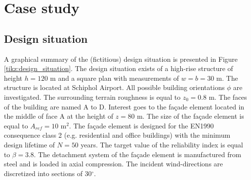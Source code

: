%
%
%
%
%
%
%
%


\section{Case study}\label{case_study}

\subsection{Design situation}
A graphical summary of the (fictitious) design situation is presented in Figure \ref{tikz:design_situation}. The design situation exists of a  high-rise structure of height  $h=120$ m and a square plan with measurements of $w=b=30$ m. The structure is located at Schiphol Airport. All possible building orientations $\phi$ are investigated. The surrounding terrain roughness is equal to $z_0=0.8$ m. The faces of the building are named A to D. Interest goes to the fa\c{c}ade element located in the middle of face A at the height of $z=80$ m. The size of the fa\c{c}ade element is equal to  $A_{ref}=10$ m$^2$. The fa\c{c}ade element is designed for the EN1990 consequence class 2 (e.g. residential and office buildings) with the minimum design lifetime of $N=50$ years. The target value of the reliability index is equal to $\beta=3.8$. The detachment system of the fa\c{c}ade element is manufactured from steel and is loaded in axial compression. The incident wind-directions are discretized into sections of 30$^{\circ}$. 


